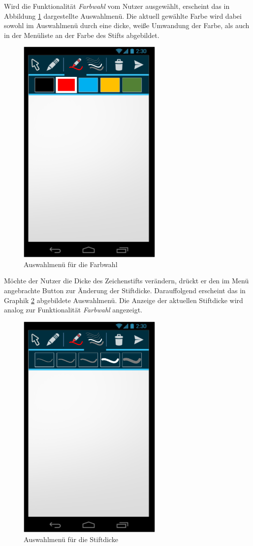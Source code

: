\documentclass{chi-ext}
\begin{document}
Wird die Funktionalität \textit{Farbwahl} vom Nutzer ausgewählt, erscheint das in Abbildung \ref{fig:mockup_color} dargestellte Auswahlmenü. Die aktuell gewählte Farbe wird dabei sowohl im Auswahlmenü durch eine dicke, weiße Umwandung der Farbe, als auch in der Menüliste an der Farbe des Stifts abgebildet.

\begin{figure}
  \centering
  \includegraphics[width=200pt]{img/android/mockup_color.png}
  \caption{Auswahlmenü für die Farbwahl}
  \label{fig:mockup_color}
\end{figure}

Möchte der Nutzer die Dicke des Zeichenstifts verändern, drückt er den im Menü angebrachte Button zur Änderung der Stiftdicke. Darauffolgend erscheint das in Graphik \ref{fig:mockup_pen} abgebildete Auswahlmenü. Die Anzeige der aktuellen Stiftdicke wird analog zur Funktionalität \textit{Farbwahl} angezeigt.

\begin{figure}
  \centering
  \includegraphics[width=200pt]{img/android/mockup_pen.png}
  \caption{Auswahlmenü für die Stiftdicke}
  \label{fig:mockup_pen}
\end{figure}
\end{document}
